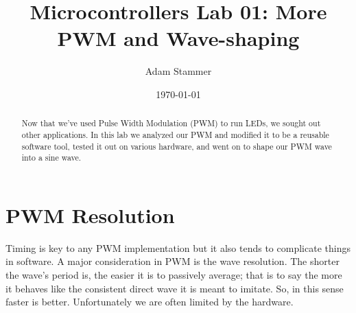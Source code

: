 \documentclass[prb,preprint]{revtex4-1}
\begin{document}
\title{Microcontrollers Lab 01: More PWM and Wave-shaping}
\author{Adam Stammer}

\date{\today}

\begin{abstract}
Now that we've used Pulse Width Modulation (PWM) to run LEDs, we sought out other applications. In this lab we analyzed our PWM and modified it to be a reusable software tool, tested it out on various hardware, and went on to shape our PWM wave into a sine wave.
\end{abstract}

\maketitle


%
%
%
%
%
%
%
%

\section{PWM Resolution}
Timing is key to any PWM implementation but it also tends to complicate things in software. A major consideration in PWM is the wave resolution. The shorter the wave's period is, the easier it is to passively average; that is to say the more it behaves like the consistent direct wave it is meant to imitate. So, in this sense faster is better. Unfortunately we are often limited by the hardware.
\end{document}

